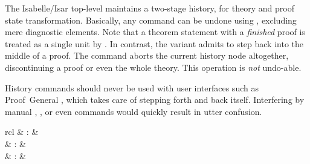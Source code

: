 \begin{isabellebody}
\begin{isamarkuptext}
  The Isabelle/Isar top-level maintains a two-stage history, for
  theory and proof state transformation.  Basically, any command can
  be undone using \hyperlink{command.undo}{\mbox{}}, excluding mere diagnostic
  elements.  Note that a theorem statement with a \emph{finished}
  proof is treated as a single unit by \hyperlink{command.undo}{\mbox{}}.  In
  contrast, the variant \hyperlink{command.linear-undo}{\mbox{}} admits to step back
  into the middle of a proof.  The \hyperlink{command.kill}{\mbox{}} command aborts
  the current history node altogether, discontinuing a proof or even
  the whole theory.  This operation is \emph{not} undo-able.

  \begin{warn}
    History commands should never be used with user interfaces such as
    Proof~General \cite{proofgeneral,Aspinall:TACAS:2000}, which takes
    care of stepping forth and back itself.  Interfering by manual
    \hyperlink{command.undo}{\mbox{}}, \hyperlink{command.linear-undo}{\mbox{}}, or even \hyperlink{command.kill}{\mbox{}} commands would quickly result in utter confusion.
  \end{warn}%
\end{isamarkuptext}%
\isamarkuptrue%
%
\isamarkuptrue%
%
\begin{isamarkuptext}%
\begin{matharray}{rcl}
    \hypertarget{command.cd}{\hyperlink{command.cd}{\mbox{}}}\isa{{\isachardoublequote}\isactrlsup {\isacharasterisk}{\isachardoublequote}} & : &  \\
    \hypertarget{command.pwd}{\hyperlink{command.pwd}{\mbox{}}}\isa{{\isachardoublequote}\isactrlsup {\isacharasterisk}{\isachardoublequote}} & : &  \\
    \hypertarget{command.use-thy}{\hyperlink{command.use-thy}{\mbox{}}}\isa{{\isachardoublequote}\isactrlsup {\isacharasterisk}{\isachardoublequote}} & : &  \\
  \end{matharray}


\end{isamarkuptext}
\end{isabellebody}

